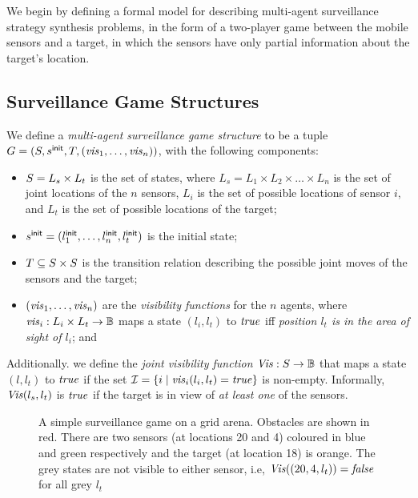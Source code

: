 We begin by defining a formal model for describing multi-agent surveillance strategy synthesis problems, in the form of a two-player game between the mobile sensors and a target, in which the sensors have only partial information about the target's location. 

\subsection{Surveillance Game Structures}\label{sec:surveillance-games}
We define a \emph{multi-agent surveillance game structure} to be  a tuple $G  = (S,s^{\mathsf{init}},T,(\mathit{vis}_1,\dots,\mathit{vis}_n))$, with the following components:
\begin{itemize}
\item $S = L_s \times L_t$ is the set of states, where $L_{s} = L_1 \times L_2 \times\dots \times L_n$ is the set of joint locations of the $n$ sensors, $L_i$ is the set of possible locations of sensor $i$,  and $L_t$ is the set of possible locations of the target;
\item $s^{\mathsf{init}} = (l^{\mathsf{init}}_1,\ldots,l^{\mathsf{init}}_n,l_t^{\mathsf{init}})$ is the initial state;
\item $T \subseteq S \times S$ is the transition relation describing the possible joint moves of the sensors and the target;
\item  $(\mathit{vis}_1,\dots,\mathit{vis}_n)$ are the \textit{visibility functions} for the $n$ agents, where $\mathit{vis}_i: L_{i} \times L_t \to \mathbb{B}$ maps a state $(l_{i},l_t)$ to $\mathit{true}$ iff \emph{ position $l_t$ is in the area of sight of $l_i$}; and
\end{itemize}

Additionally. we define the \emph{joint visibility function} $\mathit{Vis} : S \to \mathbb{B}$ that maps a state $(l,l_t)$ to $\mathit{true}$ if the set $\mathcal{I} = \{i \mid \mathit{vis}_i(l_i,l_t) = \mathit{true}\}$ is non-empty. Informally, $\mathit{Vis}(l_s,l_t)$ is $\mathit{true}$ if the target is in view of \emph{at least one} of the sensors.

\begin{figure}
{}
\caption{A simple surveillance game on a grid arena. Obstacles are shown in red. There are two sensors (at locations 20 and 4) coloured in blue and green respectively and the target (at location 18) is orange. The grey states are not visible to either sensor, i.e, $\mathit{Vis}((20,4,l_t)) = \mathit{false}$ for all grey $l_t$  }
\label{fig:simple-surveillance-game}
\vspace{-.7cm}
\end{figure}


